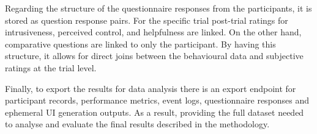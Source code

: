Regarding the structure of the questionnaire responses from the participants, it is stored as question response pairs. For the specific trial post-trial ratings for intrusiveness, perceived control, and helpfulness are linked. On the other hand, comparative questions are linked to only the participant. By having this structure, it allows for direct joins between the behavioural data and subjective ratings at the trial level.

Finally, to export the results for data analysis there is an export endpoint for participant records, performance metrics, event logs, questionnaire responses and ephemeral UI generation outputs. As a result, providing the full dataset needed to analyse and evaluate the final results described in the methodology.
